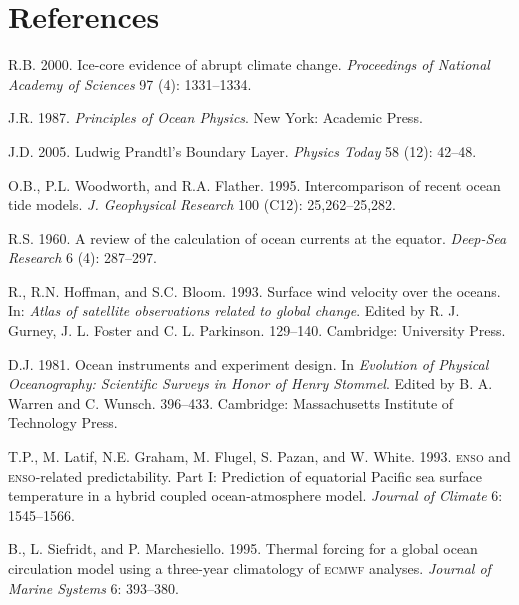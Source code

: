 \chapter{References}
\begin{description}
\setlength{\itemsep}{0pt}
\footnotesize

\item [Alley]R.B. 2000. Ice-core evidence of abrupt climate change.
\textit{Proceedings of National Academy of Sciences} 97 (4): 1331--1334.

\item[Apel]J.R. 1987. \textit{Principles of Ocean Physics}.  New York: Academic
Press.

\item [Anderson]J.D. 2005. Ludwig Prandtl's Boundary Layer. \textit{Physics Today} 58 (12): 42--48.

\item [Andersen]O.B., P.L. Woodworth, and R.A. Flather. 1995. Intercomparison
of recent ocean tide models. \textit{J. Geophysical Research} 100 (C12):
25,262--25,282.

\item [Arthur]R.S. 1960. A review of the calculation of ocean currents at the
equator. \textit{Deep-Sea Research} 6 (4): 287--297.

\item [Atlas]R., R.N. Hoffman, and S.C. Bloom. 1993. Surface wind velocity over the oceans. In: \textit{Atlas of satellite observations related to global change}. Edited by R. J. Gurney, J. L. Foster and C. L. Parkinson. 129--140. Cambridge: University Press.

\item [Baker]D.J. 1981. Ocean instruments and experiment design. In
\textit{Evolution of Physical Oceanography: Scientific Surveys in Honor of Henry
Stommel}. Edited by B. A. Warren and C. Wunsch. 396--433. Cambridge: Massachusetts Institute of Technology Press.

\item [Barnett]T.P., M. Latif, N.E. Graham, M. Flugel, S. Pazan, and W. White.
1993. \textsc{enso} and \textsc{enso}-related predictability. Part I: Prediction
of equatorial Pacific sea surface temperature in a hybrid coupled
ocean-atmosphere model. \textit{Journal of Climate} 6: 1545--1566.

\item [Barnier]B., L. Siefridt, and P. Marchesiello. 1995. Thermal forcing for
a global ocean circulation model using a three-year climatology of \textsc{ecmwf}
analyses. \textit{Journal of Marine Systems} 6: 393--380.


\end{description}
